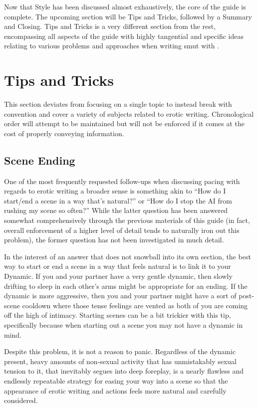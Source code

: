 \documentclass[Source-main.tex]{subfiles}
\begin{document}
Now that Style has been discussed almost exhaustively, the core of the guide is complete.
The upcoming section will be Tips and Tricks, followed by a Summary and Closing.
Tips and Tricks is a very different section from the rest, encompassing all aspects of the guide with highly tangential and specific ideas relating to various problems and approaches when writing smut with \aid.

\chapter{Tips and Tricks}
\label{ch:tips}

This section deviates from focusing on a single topic to instead break with convention and cover a variety of subjects related to erotic writing.
Chronological order will attempt to be maintained but will not be enforced if it comes at the cost of properly conveying information.

\section{Scene Ending}
\label{sec:sceneend}

One of the most frequently requested follow-ups when discussing pacing with regards to erotic writing a broader sense is something akin to “How do I start/end a scene in a way that’s natural?” or “How do I stop the AI from rushing my scene so often?” While the latter question has been answered somewhat comprehensively through the previous materials of this guide (in fact, overall enforcement of a higher level of detail tends to naturally iron out this problem), the former question has not been investigated in much detail.

In the interest of an answer that does not snowball into its own section, the best way to start or end a scene in a way that feels natural is to link it to your Dynamic.
If you and your partner have a very gentle dynamic, then slowly drifting to sleep in each other’s arms might be appropriate for an ending.
If the dynamic is more aggressive, then you and your partner might have a sort of post-scene cooldown where those tense feelings are vented as both of you are coming off the high of intimacy.
Starting scenes can be a bit trickier with this tip, specifically because when starting out a scene you may not have a dynamic in mind.

Despite this problem, it is not a reason to panic.
Regardless of the dynamic present, heavy amounts of non-sexual activity that has unmistakably sexual tension to it, that inevitably segues into deep foreplay, is a nearly flawless and endlessly repeatable strategy for easing your way into a scene so that the appearance of erotic writing and actions feels more natural and carefully considered.
\end{document}
